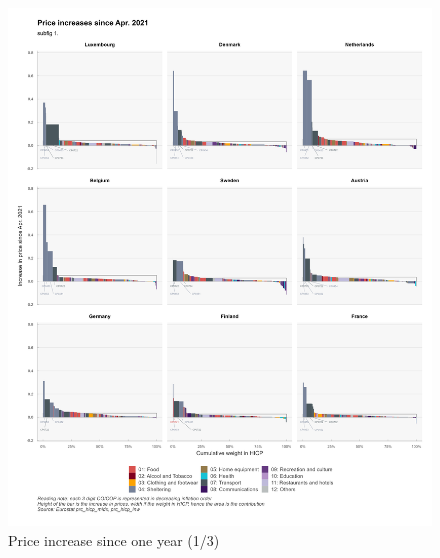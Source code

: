 \documentclass[
  9pt,
  a4paper,
  DIV=11,
  numbers=noendperiod]{scrartcl}
\begin{document}
\begin{figure}

\caption{Price increase since one year (1/3)}

{\centering \includegraphics[width=17cm,height=\textheight]{../svg/depuis_1y_1.png}

}

\end{figure}
\end{document}
